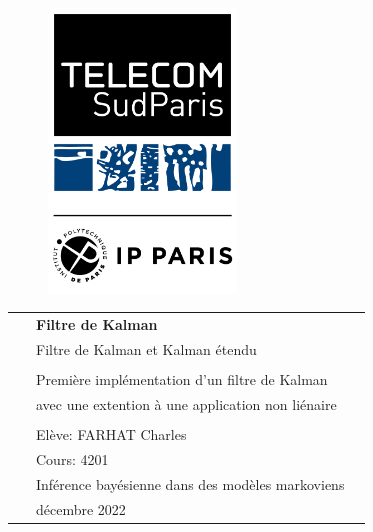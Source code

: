\begin{center}
	
	\vspace*{1cm}
	
	\begin{figure}
		\raggedleft
		\begin{minipage}{4cm}
			\includegraphics[width=5cm]{images/logo.png}
		\end{minipage}
	\end{figure}
	
	\vspace*{2cm}
	
	\vspace*{0.1in}
	
	\begin{spacing}{1.7}
		
		\begin{tabular}{p{4cm} ll}
			
			& \textbf{\huge Filtre de Kalman}\\ %
			& \Large Filtre de Kalman et Kalman étendu\\ %
			& \\
			& \large Première implémentation d'un filtre de Kalman  \\
			& \large avec une extention à une application non liénaire \\
			
			& \\
			& \large Elève: FARHAT Charles \\
			& \large Cours: 4201 \\
			& \large Inférence bayésienne dans des modèles markoviens \\\
			& \large décembre 2022
		\end{tabular}
		
	\end{spacing}
	
\end{center}



\thispagestyle{empty} %
\clearpage\setcounter{page}{1} %
\pagenumbering{roman} %
